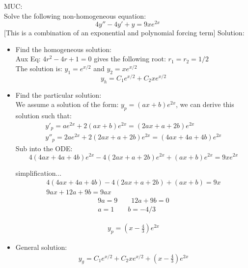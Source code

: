\begin{exmp}{MUC:}\\
Solve the following non-homogeneous equation:
\begin{equation*}
4y''-4y'+y=9xe^{2x}
\end{equation*}
[This is a combination of an exponential and polynomial forcing term]
Solution:
\begin{itemize}
\item Find the homogeneous solution:\\
Aux Eq: $4r^2-4r+1=0$ gives the following root: $r_1=r_2=1/2$\\
The solution is: $y_1=e^{x/2}$ and $y_2=xe^{x/2}$
\begin{equation*}
\boxed{y_h=C_1 e^{x/2} + C_2xe^{x/2}}
\end{equation*}
\item Find the particular solution:\\
We assume a solution of the form: $y_p=(ax+b)e^{2x}$, we can derive this solution such that:
\begin{align*}
y'_p=ae^{2x}+2(ax+b)e^{2x}=(2ax+a+2b)e^{2x}\\
y''_p=2ae^{2x}+2(2ax+a+2b)e^{2x}= (4ax+4a+4b)e^{2x}
\end{align*}
Sub into the ODE:
\begin{equation*}
4(4ax+4a+4b)e^{2x}-4(2ax+a+2b)e^{2x}+(ax+b)e^{2x}=9xe^{2x}
\end{equation*}

simplification...
\begin{align*}
4(4ax+4a+4b)-4(2ax+a+2b)+(ax+b)=9x\\
9ax +12 a+ 9b = 9ax
\end{align*}
\begin{align*}
9a=9 \qquad 12a+9b=0\\
a = 1 \qquad b =-4/3
\end{align*}


\begin{align*}
\boxed{y_p = (x-\frac{4}{3})e^{2x}}
\end{align*}
\item General solution:
\begin{align*}
\boxed{y_g =C_1 e^{x/2} + C_2xe^{x/2}+ (x-\frac{4}{3})e^{2x}}
\end{align*}
\end{itemize}
\end{exmp}


